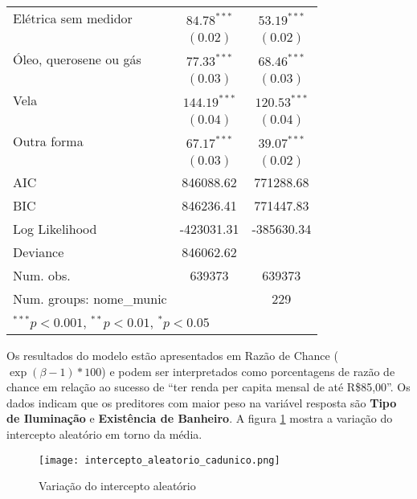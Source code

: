 \documentclass[a4paper, 12pt, openright, oneside, english, brazil, article]{abntex2}
\begin{document}
\begin{table}[!h]
{\begin{tabular}{l c c}
				Elétrica sem medidor             & $84.78^{***}$  & $53.19^{***}$  \\
				& $(0.02)$      & $(0.02)$      \\
				Óleo, querosene ou gás           & $77.33^{***}$  & $68.46^{***}$  \\
				& $(0.03)$      & $(0.03)$      \\
				Vela                             & $144.19^{***}$  & $120.53^{***}$  \\
				& $(0.04)$      & $(0.04)$      \\
				Outra forma                      & $67.17^{***}$  & $39.07^{***}$  \\
				& $(0.03)$      & $(0.02)$      \\
				\hline
				AIC                                                         & 846088.62     & 771288.68     \\
				BIC                                                         & 846236.41     & 771447.83     \\
				Log Likelihood                                              & -423031.31    & -385630.34    \\
				Deviance                                                    & 846062.62     &               \\
				Num. obs.                                                   & 639373        & 639373        \\
				Num. groups: nome\_munic                                    &               & 229           \\
				
				\hline
				\multicolumn{3}{l}{\scriptsize{$^{***}p<0.001$, $^{**}p<0.01$, $^*p<0.05$}}
			\end{tabular}
		}
		{}
	\end{table}
	
	
	Os resultados do modelo estão apresentados em Razão de Chance ($\exp(\beta - 1) * 100$) e podem ser interpretados como porcentagens de razão de chance em relação ao sucesso de ``ter renda per capita mensal de até R\$85,00''. Os dados indicam que os preditores com maior peso na variável resposta são \textbf{Tipo de Iluminação} e \textbf{Existência de Banheiro}. A figura \ref{intercepto-aleatorio} mostra a variação do intercepto aleatório em torno da média.
	
	\begin{figure}
		\centering
		\caption{Variação do intercepto aleatório}
		\label{intercepto-aleatorio}
		\texttt{[image: intercepto\_aleatorio\_cadunico.png]}
	\end{figure}
	
\newpage


\cleardoublepage{}
\end{document}
